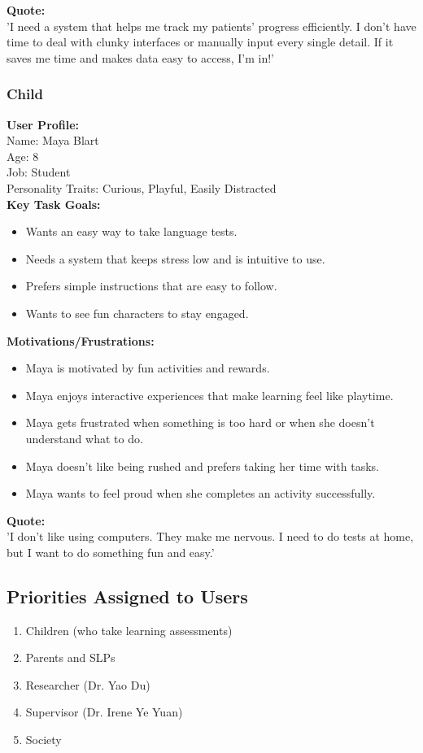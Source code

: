 \documentclass[12pt]{article}
\begin{document}
\textbf{Quote:}\\
'I need a system that helps me track my patients' progress efficiently. I don't have time to deal with clunky interfaces or manually input every single detail. If it saves me time and makes data easy to access, I'm in!'

\subsubsection*{Child}
\textbf{User Profile:}\\
Name: Maya Blart\\
Age: 8\\
Job: Student\\
Personality Traits: Curious, Playful, Easily Distracted\\

\textbf{Key Task Goals:}
\begin{itemize}
  \item Wants an easy way to take language tests.
  \item Needs a system that keeps stress low and is intuitive to use.
  \item Prefers simple instructions that are easy to follow.
  \item Wants to see fun characters to stay engaged.
\end{itemize}

\textbf{Motivations/Frustrations:}
\begin{itemize}
  \item Maya is motivated by fun activities and rewards.
  \item Maya enjoys interactive experiences that make learning feel like playtime.
  \item Maya gets frustrated when something is too hard or when she doesn't understand what to do.
  \item Maya doesn't like being rushed and prefers taking her time with tasks.
  \item Maya wants to feel proud when she completes an activity successfully.
\end{itemize}

\textbf{Quote:}\\
'I don't like using computers. They make me nervous. I need to do tests at home, but I want to do something fun and easy.'

\subsection{Priorities Assigned to Users}
\begin{enumerate}
  \item Children (who take learning assessments)
  \item Parents and SLPs
  \item Researcher (Dr. Yao Du)
  \item Supervisor (Dr. Irene Ye Yuan)
  \item Society
\end{enumerate}
\end{document}
